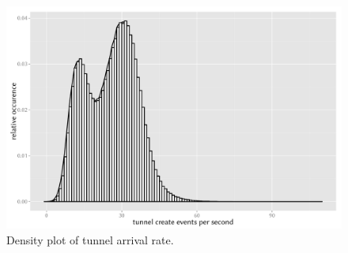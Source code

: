 \documentclass{beamer}
\begin{document}
\begin{frame}
	\begin{figure}
		\centering
			\includegraphics[width=1.0\columnwidth]{../../chapters/041-mobilenetsmeasuring/images/R-create-frequency.pdf}
		\caption{Density plot of tunnel arrival rate.}
	\end{figure}
\end{frame}
\end{document}

